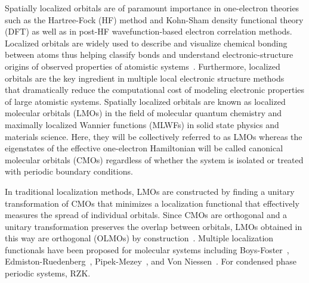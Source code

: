 \documentclass[aps,prl,reprint,amsmath,amssymb]{revtex4-1}
\begin{document}
Spatially localized orbitals are of paramount importance in one-electron theories such as the Hartree-Fock (HF) method and Kohn-Sham density functional theory (DFT) as well as in post-HF wavefunction-based electron correlation methods. 
Localized orbitals are widely used to describe and visualize chemical bonding between atoms thus helping classify bonds and understand electronic-structure origins of observed properties of atomistic systems~\cite{RZK}. 
Furthermore, localized orbitals are the key ingredient in multiple local electronic structure methods~\cite{goedecker1999efficient, bowler2012methods, zalesny2011linear, RZK-localMP2, RZK-localCC} that dramatically reduce the computational cost of modeling electronic properties of large atomistic systems. %
Spatially localized orbitals are known as localized molecular orbitals (LMOs) in the field of molecular quantum chemistry and maximally localized Wannier functions (MLWFs) in solid state physics and materials science. 
Here, they will be collectively referred to as LMOs whereas the eigenstates of the effective one-electron Hamiltonian will be called canonical molecular orbitals (CMOs) regardless of whether the system is isolated or treated with periodic boundary conditions.

%

In traditional localization methods, LMOs are constructed by finding a unitary transformation of CMOs that minimizes a localization functional that effectively measures the spread of individual orbitals. 
Since CMOs are orthogonal and a unitary transformation preserves the overlap between orbitals, LMOs obtained in this way are orthogonal (OLMOs) by construction~\cite{weinstein1971localized}.
Multiple localization functionals have been proposed for molecular systems including Boys-Foster~\cite{boys1960construction}, Edmiston-Ruedenberg~\cite{bytautas2002electron, bytautas2003split, edmiston1963localized}, Pipek-Mezey~\cite{pipek1989a_fast}, and Von Niessen~\cite{niessen1972density}. For condensed phase periodic systems, RZK. 
\end{document}
